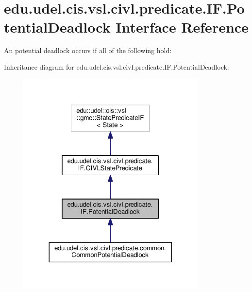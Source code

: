 \hypertarget{interfaceedu_1_1udel_1_1cis_1_1vsl_1_1civl_1_1predicate_1_1IF_1_1PotentialDeadlock}{}\section{edu.\+udel.\+cis.\+vsl.\+civl.\+predicate.\+I\+F.\+Potential\+Deadlock Interface Reference}
\label{interfaceedu_1_1udel_1_1cis_1_1vsl_1_1civl_1_1predicate_1_1IF_1_1PotentialDeadlock}


An potential deadlock occurs if all of the following hold\+:  




Inheritance diagram for edu.\+udel.\+cis.\+vsl.\+civl.\+predicate.\+I\+F.\+Potential\+Deadlock\+:
\nopagebreak
\begin{figure}[H]
\begin{center}
\leavevmode
\includegraphics[width=269pt]{interfaceedu_1_1udel_1_1cis_1_1vsl_1_1civl_1_1predicate_1_1IF_1_1PotentialDeadlock__inherit__graph}
\end{center}
\end{figure}


